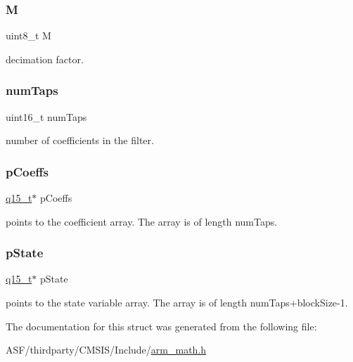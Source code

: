 \subsubsection{\texorpdfstring{M}{M}}
{\footnotesize\ttfamily uint8\+\_\+t M}

decimation factor. \mbox{\label{structarm__fir__decimate__instance__q15_a751941891e47f522a7f5375fe8990aac}} 
\subsubsection{\texorpdfstring{numTaps}{numTaps}}
{\footnotesize\ttfamily uint16\+\_\+t num\+Taps}

number of coefficients in the filter. \mbox{\label{structarm__fir__decimate__instance__q15_a7ca181a37f714d174445f486bebce26f}} 
\subsubsection{\texorpdfstring{pCoeffs}{pCoeffs}}
{\footnotesize\ttfamily \mbox{\hyperlink{arm__math_8h_ab5a8fb21a5b3b983d5f54f31614052ea}{q15\+\_\+t}}$\ast$ p\+Coeffs}

points to the coefficient array. The array is of length num\+Taps. \mbox{\label{structarm__fir__decimate__instance__q15_ae29dfdb736374fcddaeaec4b7770170c}} 
\subsubsection{\texorpdfstring{pState}{pState}}
{\footnotesize\ttfamily \mbox{\hyperlink{arm__math_8h_ab5a8fb21a5b3b983d5f54f31614052ea}{q15\+\_\+t}}$\ast$ p\+State}

points to the state variable array. The array is of length num\+Taps+block\+Size-\/1. 

The documentation for this struct was generated from the following file\+:\begin{DoxyCompactItemize}
\item 
A\+S\+F/thirdparty/\+C\+M\+S\+I\+S/\+Include/\mbox{\hyperlink{arm__math_8h}{arm\+\_\+math.\+h}}\end{DoxyCompactItemize}
